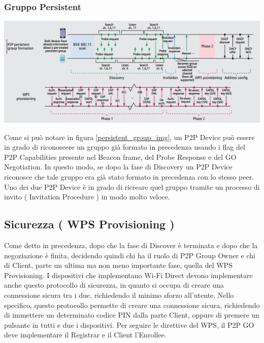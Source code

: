 \subsubsection{Gruppo Persistent}

\begin{center}
\includegraphics[width=1\textwidth]{imgs/Persistent_Group.jpg}
\label{persistent_group_img}%
\end{center}

Come si può notare in figura \ref{persistent_group_img}, un P2P Device può essere in grado di riconoscere un gruppo già formato in precedenza usando i flag del P2P Capabilities presente nel Beacon frame, del Probe Response e del GO Negotiation.
In questo modo, se dopo la fase di Discovery un P2P Device riconosce che tale gruppo era già stato formato in precedenza con lo stesso peer.
Uno dei due P2P Device è in grado di ricreare quel gruppo tramite un processo di invito ( Invitation Procedure ) in modo molto veloce.

\subsection{Sicurezza ( WPS Provisioning )}

Come detto in precedenza, dopo che la fase di Discover è terminata e dopo che la negoziazione è finita, decidendo quindi chi ha il ruolo di P2P Group Owner e chi di Client, parte un ultima ma non meno importante fase, quella del WPS Provisioning.
I dispositivi che implementano Wi-Fi Direct devono implementare anche questo protocollo di sicurezza, in quanto si occupa di creare una connessione sicura tra i due, richiedendo il minimo sforzo all’utente.
Nello specifico, questo protocollo permette di creare una connessione sicura, richiedendo di immettere un determinato codice PIN dalla parte Client, oppure di premere un pulsante in tutti e due i dispositivi.
Per seguire le direttive del WPS, il P2P GO deve implementare il Registrar e il Client l’Enrollee.

